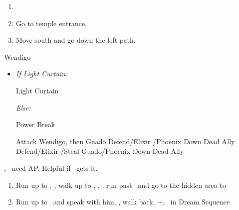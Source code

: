 \begin{enumerate}[resume]
	\item \formation{\rikku}{\tidus}{\yuna}
	\item Go to temple entrance, \sd
	\item Move south and go down the left path.
\end{enumerate}
\begin{battle}[18000]{Wendigo}
	\begin{itemize}
		\tidusf Haste \tidus
		\tidusf Switch Weapon to Brotherhood
		\tidusf Attack Guado B (Top One)
		\item \textit{If Light Curtain:}
		      \begin{itemize}
			      \rikkuf Light Curtain \tidus
		      \end{itemize}
		      \textit{Else:}
		      \begin{itemize}
			      \switch{\rikku}{\auron}
			      \auronf Power Break
		      \end{itemize}
		      \tidusf Attack Wendigo, then Guado
		      \yunaf Defend/Elixir \tidus/Phoenix Down Dead Ally
		      \rikkuf Defend/Elixir \tidus/Steal Guado/Phoenix Down Dead Ally
		      \switch{\yuna}{\lulu}
	\end{itemize}
	\yuna, \tidus\ need AP. Helpful if \lulu\ gets it.
\end{battle}
\begin{enumerate}[resume]
	\item Run up to \rikku, \sd, walk up to \yuna, \sd, \save, run past \kimahri\ and go to the hidden area to 
	\item Run up to \auron\ and speak with him, \sd, walk back, \cs+\skippablefmv[1:00], \sd\ in Dream Sequence
\end{enumerate}